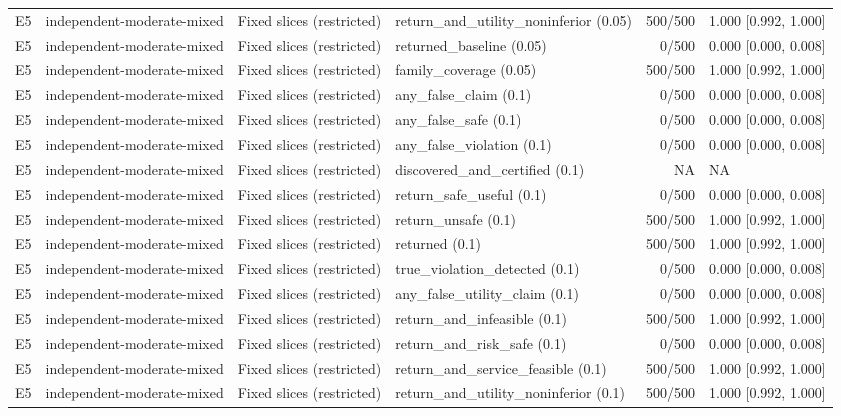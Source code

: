 \begin{longtable}{p{.04\linewidth}p{.18\linewidth}p{.19\linewidth}p{.16\linewidth}r p{.21\linewidth}}
E5 & independent-moderate-mixed & Fixed slices (restricted) & return\_and\_utility\_noninferior (0.05) & 500/500 & 1.000 [0.992, 1.000]\\
E5 & independent-moderate-mixed & Fixed slices (restricted) & returned\_baseline (0.05) & 0/500 & 0.000 [0.000, 0.008]\\
E5 & independent-moderate-mixed & Fixed slices (restricted) & family\_coverage (0.05) & 500/500 & 1.000 [0.992, 1.000]\\
E5 & independent-moderate-mixed & Fixed slices (restricted) & any\_false\_claim (0.1) & 0/500 & 0.000 [0.000, 0.008]\\
E5 & independent-moderate-mixed & Fixed slices (restricted) & any\_false\_safe (0.1) & 0/500 & 0.000 [0.000, 0.008]\\
E5 & independent-moderate-mixed & Fixed slices (restricted) & any\_false\_violation (0.1) & 0/500 & 0.000 [0.000, 0.008]\\
E5 & independent-moderate-mixed & Fixed slices (restricted) & discovered\_and\_certified (0.1) & NA & NA\\
E5 & independent-moderate-mixed & Fixed slices (restricted) & return\_safe\_useful (0.1) & 0/500 & 0.000 [0.000, 0.008]\\
E5 & independent-moderate-mixed & Fixed slices (restricted) & return\_unsafe (0.1) & 500/500 & 1.000 [0.992, 1.000]\\
E5 & independent-moderate-mixed & Fixed slices (restricted) & returned (0.1) & 500/500 & 1.000 [0.992, 1.000]\\
E5 & independent-moderate-mixed & Fixed slices (restricted) & true\_violation\_detected (0.1) & 0/500 & 0.000 [0.000, 0.008]\\
E5 & independent-moderate-mixed & Fixed slices (restricted) & any\_false\_utility\_claim (0.1) & 0/500 & 0.000 [0.000, 0.008]\\
E5 & independent-moderate-mixed & Fixed slices (restricted) & return\_and\_infeasible (0.1) & 500/500 & 1.000 [0.992, 1.000]\\
E5 & independent-moderate-mixed & Fixed slices (restricted) & return\_and\_risk\_safe (0.1) & 0/500 & 0.000 [0.000, 0.008]\\
E5 & independent-moderate-mixed & Fixed slices (restricted) & return\_and\_service\_feasible (0.1) & 500/500 & 1.000 [0.992, 1.000]\\
E5 & independent-moderate-mixed & Fixed slices (restricted) & return\_and\_utility\_noninferior (0.1) & 500/500 & 1.000 [0.992, 1.000]\\

\end{longtable}
